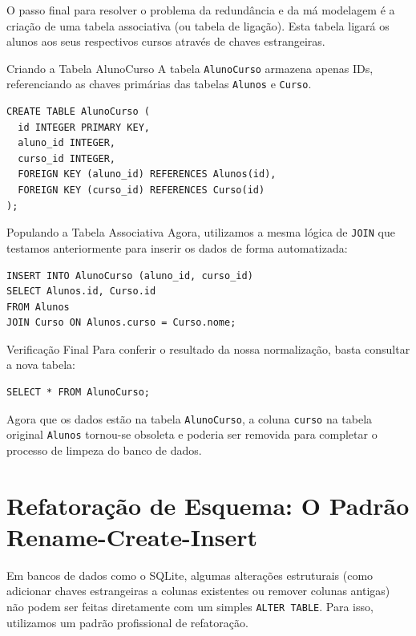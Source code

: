 \documentclass[12pt]{article}
\begin{document}
O passo final para resolver o problema da redundância e da má modelagem é a criação de uma tabela associativa (ou tabela de ligação). Esta tabela ligará os alunos aos seus respectivos cursos através de chaves estrangeiras.

\begin{block}{Criando a Tabela AlunoCurso}
A tabela \texttt{AlunoCurso} armazena apenas IDs, referenciando as chaves primárias das tabelas \texttt{Alunos} e \texttt{Curso}.

\begin{lstlisting}
CREATE TABLE AlunoCurso (
  id INTEGER PRIMARY KEY,
  aluno_id INTEGER,
  curso_id INTEGER,
  FOREIGN KEY (aluno_id) REFERENCES Alunos(id),
  FOREIGN KEY (curso_id) REFERENCES Curso(id)
);
\end{lstlisting}
\end{block}

\begin{block}{Populando a Tabela Associativa}
Agora, utilizamos a mesma lógica de \texttt{JOIN} que testamos anteriormente para inserir os dados de forma automatizada:

\begin{lstlisting}
INSERT INTO AlunoCurso (aluno_id, curso_id)
SELECT Alunos.id, Curso.id
FROM Alunos
JOIN Curso ON Alunos.curso = Curso.nome;
\end{lstlisting}
\end{block}

\begin{block}{Verificação Final}
Para conferir o resultado da nossa normalização, basta consultar a nova tabela:

\begin{lstlisting}
SELECT * FROM AlunoCurso;
\end{lstlisting}
\end{block}

\begin{atencao}
Agora que os dados estão na tabela \texttt{AlunoCurso}, a coluna \texttt{curso} na tabela original \texttt{Alunos} tornou-se obsoleta e poderia ser removida para completar o processo de limpeza do banco de dados.
\end{atencao}
\section{Refatoração de Esquema: O Padrão Rename-Create-Insert}

Em bancos de dados como o SQLite, algumas alterações estruturais (como adicionar chaves estrangeiras a colunas existentes ou remover colunas antigas) não podem ser feitas diretamente com um simples \texttt{ALTER TABLE}. Para isso, utilizamos um padrão profissional de refatoração.
\end{document}
